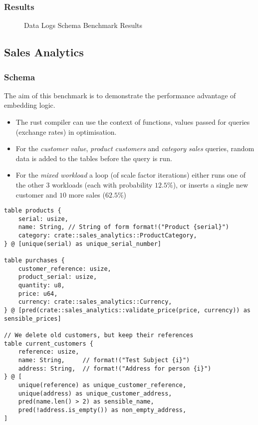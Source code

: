 \subsubsection{Results}
\begin{figure}[h!]
    \centering
    \vspace{-0.4em}
    \resizebox{\textwidth}{!}{}
    \caption{Data Logs Schema Benchmark Results}
    \label{fig:data_log_benchmark_results}
\end{figure}
\subsection{Sales Analytics}
\subsubsection{Schema}
The aim of this benchmark is to demonstrate the performance advantage of embedding logic.
\begin{itemize}
    \setlength\itemsep{0em}
    \item The rust compiler can use the context of functions, values passed for queries (exchange rates) in optimisation.
    \item For the \textit{customer value}, \textit{product customers} and \textit{category sales} queries, random data is added to the tables before the query is run.
    \item For the \textit{mixed workload} a loop (of scale factor iterations) either runs one of the other 3 workloads (each with probability $12.5\%$), or inserts a single new customer and $10$ more sales ($62.5\%$)
\end{itemize}
\begin{verbatim}
table products {
    serial: usize,
    name: String, // String of form format!("Product {serial}")
    category: crate::sales_analytics::ProductCategory,
} @ [unique(serial) as unique_serial_number]

table purchases {
    customer_reference: usize,
    product_serial: usize,
    quantity: u8,
    price: u64,
    currency: crate::sales_analytics::Currency,
} @ [pred(crate::sales_analytics::validate_price(price, currency)) as sensible_prices]

// We delete old customers, but keep their references
table current_customers {
    reference: usize,
    name: String,     // format!("Test Subject {i}")
    address: String,  // format!("Address for person {i}")
} @ [
    unique(reference) as unique_customer_reference,
    unique(address) as unique_customer_address,
    pred(name.len() > 2) as sensible_name,
    pred(!address.is_empty()) as non_empty_address,
]
\end{verbatim}
